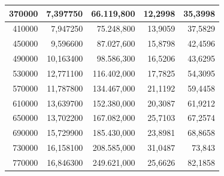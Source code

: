 \documentclass[a4paper, 12pt]{article}
\begin{document}
\begin{longtable}[c]{@{}rrrrr@{}}
	\multicolumn{1}{|r|}{370000}                  & \multicolumn{1}{r|}{7,397750}      & \multicolumn{1}{r|}{66.119,800}    & \multicolumn{1}{r|}{12,2998}       & \multicolumn{1}{r|}{35,3998}       \\* \midrule
	\multicolumn{1}{|r|}{410000}                  & \multicolumn{1}{r|}{7,947250}      & \multicolumn{1}{r|}{75.248,800}    & \multicolumn{1}{r|}{13,9059}       & \multicolumn{1}{r|}{37,5829}       \\* \midrule
	\multicolumn{1}{|r|}{450000}                  & \multicolumn{1}{r|}{9,596600}      & \multicolumn{1}{r|}{87.027,600}    & \multicolumn{1}{r|}{15,8798}       & \multicolumn{1}{r|}{42,4596}       \\* \midrule
	\multicolumn{1}{|r|}{490000}                  & \multicolumn{1}{r|}{10,163400}     & \multicolumn{1}{r|}{98.586,300}    & \multicolumn{1}{r|}{16,5206}       & \multicolumn{1}{r|}{43,6295}       \\* \midrule
	\multicolumn{1}{|r|}{530000}                  & \multicolumn{1}{r|}{12,771100}     & \multicolumn{1}{r|}{116.402,000}   & \multicolumn{1}{r|}{17,7825}       & \multicolumn{1}{r|}{54,3095}       \\* \midrule
	\multicolumn{1}{|r|}{570000}                  & \multicolumn{1}{r|}{11,787800}     & \multicolumn{1}{r|}{134.467,000}   & \multicolumn{1}{r|}{21,1192}       & \multicolumn{1}{r|}{59,4458}       \\* \midrule
	\multicolumn{1}{|r|}{610000}                  & \multicolumn{1}{r|}{13,639700}     & \multicolumn{1}{r|}{152.380,000}   & \multicolumn{1}{r|}{20,3087}       & \multicolumn{1}{r|}{61,9212}       \\* \midrule
	\multicolumn{1}{|r|}{650000}                  & \multicolumn{1}{r|}{13,702200}     & \multicolumn{1}{r|}{167.082,000}   & \multicolumn{1}{r|}{25,7103}       & \multicolumn{1}{r|}{67,2574}       \\* \midrule
	\multicolumn{1}{|r|}{690000}                  & \multicolumn{1}{r|}{15,729900}     & \multicolumn{1}{r|}{185.430,000}   & \multicolumn{1}{r|}{23,8981}       & \multicolumn{1}{r|}{68,8658}       \\* \midrule
	\multicolumn{1}{|r|}{730000}                  & \multicolumn{1}{r|}{16,158100}     & \multicolumn{1}{r|}{208.585,000}   & \multicolumn{1}{r|}{31,0487}       & \multicolumn{1}{r|}{73,843}        \\* \midrule
	\multicolumn{1}{|r|}{770000}                  & \multicolumn{1}{r|}{16,846300}     & \multicolumn{1}{r|}{249.621,000}   & \multicolumn{1}{r|}{25,6626}       & \multicolumn{1}{r|}{82,1858}       \\* \midrule

\end{longtable}
\end{document}
